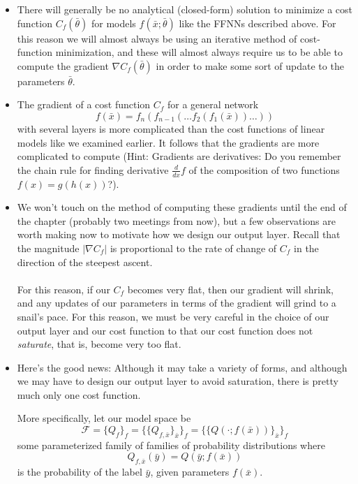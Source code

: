 \documentclass{article}
\begin{document}
\begin{itemize}

\item There will generally be no analytical (closed-form) solution to minimize a cost function $C_{f}(\bar{\theta})$ for models $f(\bar{x}; \bar{\theta})$ like the FFNNs described above.  For this reason we will almost always be using an iterative method of cost-function minimization, and these will almost always require us to be able to compute the gradient $\nabla C_{f}(\bar{\theta})$ in order to make some sort of update to the parameters $\bar{\theta}$.
\item The gradient of a cost function $C_{f}$ for a general network $$f(\bar{x}) = f_{n}(f_{n-1}(\ldots f_{2}(f_{1}(\bar{x}))\ldots ))$$ with several layers is more complicated than the cost functions of linear models like we examined earlier.  It follows that the gradients are more complicated to compute (Hint:  Gradients are derivatives:  Do you remember the chain rule for finding derivative $\frac{d}{dx}f$ of the composition of two functions $f(x) = g(h(x))$?). 
\item We won't touch on the method of computing these gradients until the end of the chapter (probably two meetings from now), but a few observations are worth making now to motivate how we design our output layer. Recall that the magnitude $\vert \nabla C_{f} \rvert$ is proportional to the rate of change of $C_{f}$ in the direction of the steepest ascent.  \paragraph{} For this reason, if our $C_{f}$ becomes very flat, then our gradient will shrink, and any updates of our parameters in terms of the gradient will grind to a snail's pace.  For this reason, we must be very careful in the choice of our output layer and our cost function to that our cost function does not \emph{saturate}, that is, become very too flat.

\item Here's the good news:  Although it may take a variety of forms, and although we may have to design our output layer to avoid saturation, there is pretty much only one cost function.

More specifically, let our model space be $$\mathscr{F} = \{Q_{f}\}_{f} =  \{\{Q_{f, \bar{x}}\}_{\bar{x}}\}_{f}  =  \{\{Q(\cdot ; f(\bar{x}))\}_{\bar{x}}\}_{f}$$  
 some parameterized family of families of probability distributions where 
$$Q_{f, \bar{x}}(\bar{y}) = Q(\bar{y} ; f(\bar{x}))$$ is the probability of the label $\bar{y}$, given parameters $f(\bar{x})$.  


\end{itemize}
\end{document}

